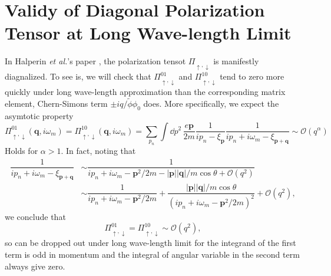 \documentclass[bachelor,english,numbers]{ustcthesis}
\begin{document}
\chapter{Validy of Diagonal Polarization Tensor at Long Wave-length Limit}
	In Halperin {\it et al.}'s paper \cite{Halperin1995Theory}, the polarization tensot $\Pi_{\uparrow,\downarrow}$ is manifestly diagnalized. To see is, we will check that $\Pi^{01}_{\uparrow,\downarrow}$ and $\Pi^{10}_{\uparrow,\downarrow}$ tend to zero more quickly under long wave-length approximation than the corresponding matrix element, Chern-Simons term $\pm iq/\widetilde{\phi}\phi_0$ does. More specifically, we expect the asymtotic property
	\begin{equation}\label{0.2.1}
		\Pi^{01}_{\uparrow,\downarrow}(\bm{q},i\omega_m)=\Pi^{10}_{\uparrow,\downarrow}(\bm{q},i\omega_m)=\sum_{p_n}\int\dd p^2\,\dfrac{e\bm{p}}{2m}\dfrac{1}{ip_n-\xi_{\bm{p}}}\dfrac{1}{ip_n+i\omega_m-\xi_{\bm{p+q}}}\sim\mathcal{O}(q^\alpha)
	\end{equation}
	Holds for $\alpha>1$. In fact, noting that 
	\begin{align*}
		\dfrac{1}{ip_n+i\omega_m-\xi_{\bm{p+q}}}&\sim\dfrac{1}{ip_n+i\omega_m-\bm{p}^2/2m-|\bm{p}||\bm{q}|/m\cos\theta+\mathcal{O}(q^2)}\\
		&\sim\dfrac{1}{ip_n+i\omega_m-\bm{p}^2/2m}+\dfrac{|\bm{p}||\bm{q}|/m\cos\theta}{(ip_n+i\omega_m-\bm{p}^2/2m)^2}+\mathcal{O}(q^2),
	\end{align*}
	we conclude that
	\begin{equation*}
		\Pi^{01}_{\uparrow,\downarrow}=\Pi^{10}_{\uparrow,\downarrow}\sim\mathcal{O}(q^2),
	\end{equation*}
	so can be dropped out under long wave-length limit for the integrand of the first term is odd in momentum and the integral of angular variable in the second term always give zero.
\end{document}
